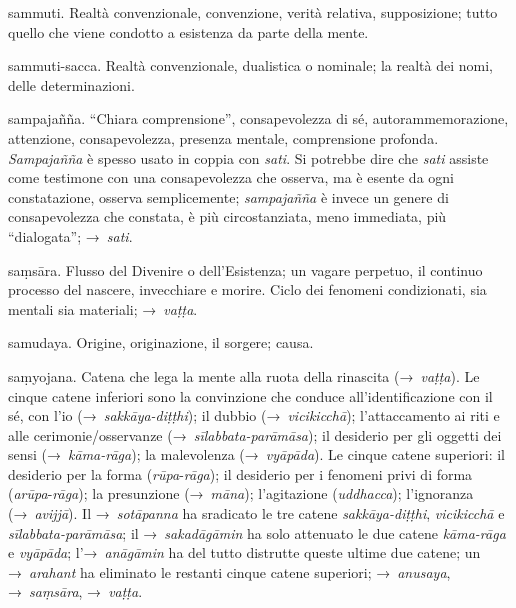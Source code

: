\begin{glossarydescription}
\item[sammuti.] Realtà convenzionale, convenzione, verità relativa,
  supposizione; tutto quello che viene condotto a esistenza da parte della
  mente.

\item[sammuti-sacca.] Realtà convenzionale, dualistica o nominale; la
  realtà dei nomi, delle determinazioni.

\item[sampajañña.] ``Chiara comprensione'', consapevolezza di sé,
  autorammemorazione, attenzione, consapevolezza, presenza mentale, comprensione
  profonda. \emph{Sampajañña} è spesso usato in coppia con \emph{sati}. Si
  potrebbe dire che \emph{sati} assiste come testimone con una consapevolezza
  che osserva, ma è esente da ogni constatazione, osserva semplicemente;
  \emph{sampajañña} è invece un genere di consapevolezza che constata, è più
  circostanziata, meno immediata, più ``dialogata''; →~\emph{sati}.

\item[saṃsāra.] Flusso del Divenire o dell'Esistenza; un vagare perpetuo,
  il continuo processo del nascere, invecchiare e morire. Ciclo dei fenomeni
  condizionati, sia mentali sia materiali; →~\emph{vaṭṭa}.

\item[samudaya.] Origine, originazione, il sorgere; causa.

\item[saṃyojana.]\label{glossary-samyojana} Catena che lega la mente alla ruota della rinascita
  (→~\emph{vaṭṭa}). Le cinque catene inferiori sono la convinzione che conduce
  all'identificazione con il sé, con l'io (→~\emph{sakkāya-diṭṭhi}); il dubbio
  (→~\emph{vicikicchā}); l'attaccamento ai riti e alle cerimonie/osservanze
  (→~\emph{sīlabbata-parāmāsa}); il desiderio per gli oggetti dei sensi
  (→~\emph{kāma-rāga}); la malevolenza (→~\emph{vyāpāda}). Le cinque catene
  superiori: il desiderio per la forma (\emph{rūpa}-\emph{rāga}); il desiderio
  per i fenomeni privi di forma (\emph{arūpa}-\emph{rāga}); la presunzione
  (→~\emph{māna}); l'agitazione (\emph{uddhacca}); l'ignoranza
  (→~\emph{avijjā}). Il →~\emph{sotāpanna} ha sradicato le tre catene
  \emph{sakkāya-diṭṭhi}, \emph{vicikicchā} e \emph{sīlabbata-parāmāsa}; il
  →~\emph{sakadāgāmin} ha solo attenuato le due catene \emph{kāma-rāga} e
  \emph{vyāpāda}; l'→~\emph{anāgāmin} ha del tutto distrutte queste ultime due
  catene; un →~\emph{arahant} ha eliminato le restanti cinque catene superiori;
  →~\emph{anusaya}, →~\emph{saṃsāra}, →~\emph{vaṭṭa}.


\end{glossarydescription}
